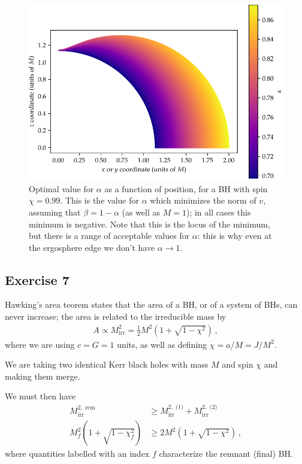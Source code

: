 \documentclass[main.tex]{subfiles}
\begin{document}
\begin{figure}[ht]
\centering
\includegraphics[width=\textwidth]{figures/kerr_killing}
\caption{Optimal value for \(\alpha \) as a function of position, for a BH with spin \(\chi = 0.99\). This is the value for \(\alpha \) which minimizes the norm of \(v\), assuming that \(\beta = 1 - \alpha \) (as well as \(M = 1\)); in all cases this minimum is negative.
Note that this is the locus of the minimum, but there is a range of acceptable values for \(\alpha \): this is why even at the ergosphere edge we don't have \(\alpha \to 1\). }
\label{fig:kerr_killing}
\end{figure}

\subsection{Exercise 7}

Hawking's area teorem states that the area of a BH, or of a system of BHs, can never increase; the area is related to the irreducible mass by 
%
\begin{align}
A \propto M _{\text{irr}}^2 = \frac{1}{2} M^2\left(1 + \sqrt{1 - \chi^2}\right)
\,,
\end{align}
%
where we are using \(c = G = 1\) units, as well as defining \(\chi = a / M = J / M^2\).  

We are taking two identical Kerr black holes with mass \(M\) and spin \(\chi\) and making them merge. 

We must then have %
\begin{align}
M_{\text{irr}}^{2, \text{ rem}} &\geq 
M^{2, \text{ (1)}} _{\text{irr}}  +
M^{2, \text{ (2)}} _{\text{irr}}  
\\
M_f^2 \left( 1+ \sqrt{1 - \chi _f^2}\right) &\geq 2 M^2\left(1 + \sqrt{1 - \chi^2}\right)
\,,
\end{align}
%
where quantities labelled with an index \(f\) characterize the remnant  (final) BH. 
\end{document}
